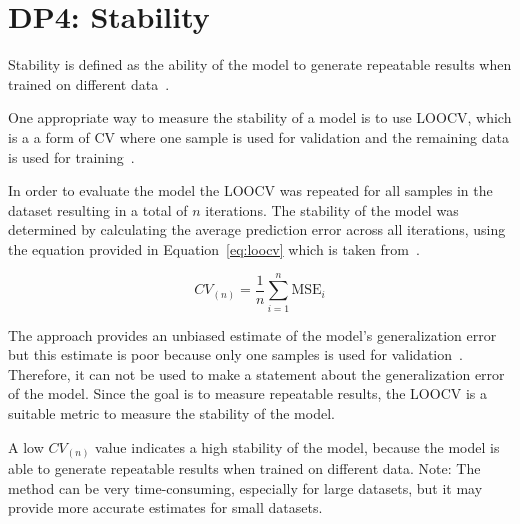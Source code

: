 \section{DP4: Stability}\label{sec:stability}
Stability is defined as the ability of the model to generate repeatable
results when trained on
different data~\cite[p. 16]{siebert2022construction}.

One appropriate way to measure the stability of a model is to use \ac{LOOCV},
which is a
a form of \ac{CV} where one sample is used for validation and the remaining
data is
used for training~\cite[p. 200--201]{gareth2013introduction}.

In order to evaluate the model the \ac{LOOCV} was repeated for all samples in
the dataset
resulting in a total of \(n\) iterations.
The stability of the model was determined by calculating the average
prediction error across all
iterations, using the equation provided in Equation~\ref{eq:loocv} which is
taken from~\cite[p.
201]{gareth2013introduction}.

\begin{tcolorbox}[arc=0pt,boxrule=0.5pt]
    \begin{equation}
        CV_{(n)} = \frac{1}{n} \sum_{i=1}^{n} \text{MSE}_{i}\label{eq:loocv}
    \end{equation}
\end{tcolorbox}

The approach provides an unbiased estimate of the model's generalization error
but this estimate is poor because only one samples is used for
validation~\cite[p.
201]{gareth2013introduction}.
Therefore, it can not be used to make a statement about the generalization
error of the model.
Since the goal is to measure repeatable results, the \ac{LOOCV} is a suitable
metric to measure
the stability of the model.

%

A low \(CV_{(n)}\) value indicates a high stability of the model, because the
model is able to
generate repeatable results when trained on different data.
Note: The method can be very time-consuming, especially for large datasets,
but it may provide
more accurate estimates for small datasets.

